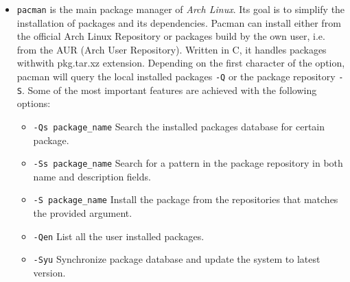 \documentclass[10pt,a4paper]{article}
\begin{document}
\begin{itemize}
		
		\item \texttt{pacman} is the main package manager of \textit{Arch Linux}. Its goal is to simplify the installation of packages and its dependencies. Pacman can install either from the official Arch Linux Repository or packages build by the own user, i.e. from the AUR (Arch User Repository). Written in C, it handles packages withwith {pkg.tar.xz} extension. Depending on the first character of the option, pacman will query the local installed packages \texttt{-Q} or the package repository \texttt{-S}. Some of the most important features are achieved with the following options:
		\begin{itemize}
			\item[] \texttt{-Qs package\_name} Search the installed packages database for certain package.
			\item[] \texttt{-Ss package\_name} Search for a pattern in the package repository in both name and description fields.
			\item[] \texttt{-S package\_name} Install the package from the repositories that matches the provided argument.
			\item[] \texttt{-Qen} List all the user installed packages.
			\item[] \texttt{-Syu} Synchronize package database and update the system to latest version.
		\end{itemize}
	\end{itemize} 
\end{document}
